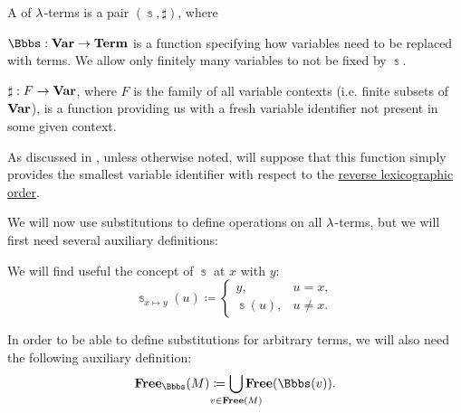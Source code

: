 \begin{definition}\label{def:lambda_term_substitution}\mimprovised
  A  of \( \mathrm{\lambda} \)-terms is a pair \( (\Bbbs, \sharp) \), where
  \begin{thmenum}[series=def:lambda_term_substitution]
     \( \Bbbs: \op*{Var} \to \op*{Term} \) is a function specifying how variables need to be replaced with terms. We allow only finitely many variables to not be fixed by \( \Bbbs \).

     \( \sharp: F \to \op*{Var} \), where \( F \) is the family of all variable contexts (i.e. finite subsets of \( \op*{Var} \)), is a function providing us with a fresh variable identifier not present in some given context.

    As discussed in , unless otherwise noted, will suppose that this function simply provides the smallest variable identifier with respect to the \hyperref[def:lexicographic_order]{reverse lexicographic order}.
  \end{thmenum}

  We will now use substitutions to define operations on all \( \mathrm{\lambda} \)-terms, but we will first need several auxiliary definitions:
  \begin{thmenum}[resume=def:lambda_term_substitution]
     We will find useful the concept of  \( \Bbbs \) at \( x \) with \( y \):
    \begin{equation}\label{eq:def:lambda_term_substitution/modified}
      \Bbbs_{x \mapsto y}(u) \coloneqq \begin{cases}
        y,        &u = x, \\
        \Bbbs(u), &u \neq x.
      \end{cases}
    \end{equation}

     In order to be able to define substitutions for arbitrary terms, we will also need the following auxiliary definition:
    \begin{equation}\label{eq:def:lambda_term_substitution/free}
      \op*{Free}_\Bbbs(M) \coloneqq \bigcup_{\mathclap{v \in \op*{Free}(M)}} \op*{Free}(\Bbbs(v)).
    \end{equation}


\end{thmenum}
\end{definition}
